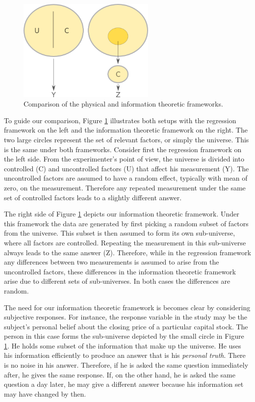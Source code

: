 \documentclass[11pt,twoside]{article}
\begin{document}
\begin{figure}[htbp]
   \centering
   \includegraphics[width = 0.6\textwidth]{regression} %
   \caption{Comparison of the physical and information theoretic frameworks.}
   \label{framework}
\end{figure}


To guide our comparison, Figure \ref{framework} illustrates both setups with the regression framework on the left and the information theoretic framework on the right. The two large circles represent the set of relevant factors, or simply the universe. This is the same under both frameworks. Consider first the regression framework on the left side. From the experimenter's point of view, the universe is divided into controlled (C) and uncontrolled factors (U) that affect his measurement (Y). The uncontrolled factors are assumed to have a random effect, typically with mean of zero, on the measurement. Therefore any repeated measurement under the same set of controlled factors leads to a slightly different answer.  


The right side of Figure \ref{framework} depicts our information theoretic framework. Under this framework the data are generated by first picking a random subset of factors from the universe. This subset is then assumed to form its own sub-universe, where all factors are controlled. Repeating the measurement in this sub-universe always leads to the same answer (Z). Therefore, while in the regression framework any differences between two measurements is assumed to arise from the uncontrolled factors, these differences in the information theoretic framework arise due to different sets of sub-universes. In both cases the differences are random. 

The need for our information theoretic framework is becomes clear by considering subjective responses. For instance, the response variable in the study may be the subject's personal belief about the closing price of a particular capital stock. The person in this case forms the sub-universe depicted by the small circle in Figure \ref{framework}. He holds some subset of  the information that make up the universe. He uses his information efficiently to produce an answer that is his \textit{personal truth}. There is no noise in his answer. Therefore, if he is asked the same question immediately after, he gives the same response. If, on the other hand, he is asked the same question a day later, he may give a different answer because his information set may have changed by then. 
\end{document}
